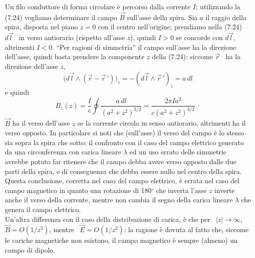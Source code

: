 Un filo conduttore di forma circolare \`e percorso dalla corrente $I$;
utilizzando la (7.24) vogliamo determinare il campo $\vec B$ sull'asse della
spira. Sia $a$ il raggio della spira, disposta nel piano $z=0$ con il centro
nell'origine; prendiamo nella (7.24) $d\vec l$ \ in verso antiorario (rispetto
all'asse $z$), quindi $I>0$ se concorde con $d\vec l$, altrimenti $I<0$.
``Per ragioni di simmetria'' il campo sull'asse ha la direzione dell'asse,
quindi basta prendere la componente $z$ della (7.24): siccome $\vec r$ \ ha la
direzione dell'asse $z$,
\begin{equation}
  \big(d\vec l\wedge(\vec r-\vec r\,')\big)_z=-(d\vec l\wedge\vec r\,')_z=a\,dl
  \tag{7.25}
\end{equation}
e quindi
\begin{equation}
  B_z(z)=\frac{I}{c}\oint\frac{a\,dl}{(a^2+z^2)^{3/2}}
  =\frac{2\pi Ia^2}{c(a^2+z^2)^{3/2}}\,\cdot
  \tag{7.26}
\end{equation}
$\vec B$ ha il verso dell'asse $z$ se la corrente circola in senso antiorario,
altrimenti ha il verso opposto. In particolare si noti che (sull'asse) il verso
del campo \`e lo stesso sia sopra la spira che sotto: il confronto con il caso
del campo elettrico generato da una circonferenza con carica lineare $\lambda$
ed un uso errato delle simmetrie avrebbe potuto far ritenere che il campo debba
avere verso opposto dalle due parti della spira, e di conseguenza che debba
essere nullo nel centro della spira. Questa conclusione, corretta nel caso del
campo elettrico, \`e errata nel caso del campo magnetico in quanto una rotazione
di 180$^\circ$ che inverta l'asse $z$ inverte anche il verso della corrente,
mentre non cambia il segno della carica lineare $\lambda$ che genera il campo
elettrico.\\
Un'altra differenza con il caso della distribuzione di carica, \`e che per
\ $|z|\to\infty$, \ $\vec B=O(1/z^3)$, mentre \ $\vec E=O(1/z^2)$: la ragione
\`e dovuta al fatto che, siccome le cariche magnetiche non esistono, il campo
magnetico \`e sempre (almeno) un campo di dipolo.

